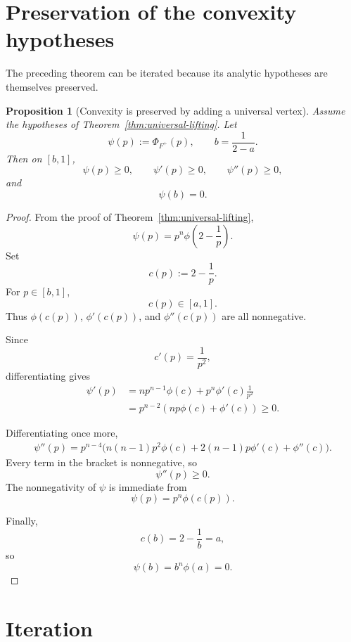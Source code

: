 \documentclass[11pt]{article}
\newtheorem{proposition}[theorem]{Proposition}
\newcommand{\1}{\mathbf{1}}
\begin{document}
\section{Preservation of the convexity hypotheses}

The preceding theorem can be iterated because its analytic hypotheses
are themselves preserved.

\begin{proposition}[Convexity is preserved by adding a universal vertex]
\label{prop:preserve}
Assume the hypotheses of
Theorem~\ref{thm:universal-lifting}.
Let
\[
\psi(p):=\Phi_{F^+}(p),
\qquad
b=\frac1{2-a}.
\]
Then on $[b,1]$,
\[
\psi(p)\ge0,
\qquad
\psi'(p)\ge0,
\qquad
\psi''(p)\ge0,
\]
and
\[
\psi(b)=0.
\]
\end{proposition}

\begin{proof}
From the proof of
Theorem~\ref{thm:universal-lifting},
\[
\psi(p)
=
p^n
\phi\!\left(2-\frac1p\right).
\]
Set
\[
c(p):=2-\frac1p.
\]
For $p\in[b,1]$,
\[
c(p)\in[a,1].
\]
Thus $\phi(c(p))$, $\phi'(c(p))$, and $\phi''(c(p))$ are all
nonnegative.

Since
\[
c'(p)=\frac1{p^2},
\]
differentiating gives
\begin{align*}
\psi'(p)
&=
np^{n-1}\phi(c)
+
p^n\phi'(c)\frac1{p^2}
\\
&=
p^{n-2}
\left(
np\phi(c)+\phi'(c)
\right)
\ge0.
\end{align*}

Differentiating once more,
\begin{align*}
\psi''(p)
=
p^{n-4}
\bigl(
n(n-1)p^2\phi(c)
+
2(n-1)p\phi'(c)
+
\phi''(c)
\bigr).
\end{align*}
Every term in the bracket is nonnegative, so
\[
\psi''(p)\ge0.
\]
The nonnegativity of $\psi$ is immediate from
\[
\psi(p)=p^n\phi(c(p)).
\]

Finally,
\[
c(b)
=
2-\frac1b
=
a,
\]
so
\[
\psi(b)
=
b^n\phi(a)
=
0.
\]
\end{proof}


\section{Iteration}
\end{document}
